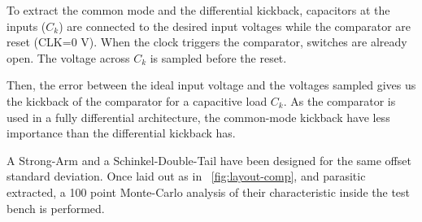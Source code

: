 To extract the common mode and the differential kickback, capacitors at the inputs (\(C_{k}\)) are connected to the desired input voltages while the comparator are reset (CLK=0 V). When the clock triggers the comparator, switches are already open. The voltage across \(C_{k}\) is sampled before the reset.

Then, the error between the ideal input voltage and the voltages sampled gives us the kickback of the comparator for a capacitive load \(C_{k}\). As the comparator is used in a fully differential architecture, the common-mode kickback have less importance than the differential kickback has.

A Strong-Arm and a Schinkel-Double-Tail have been designed for the same offset standard deviation. Once laid out as in \figurename~\ref{fig:layout-comp}, and parasitic extracted, a 100 point Monte-Carlo analysis of their characteristic inside the test bench is performed. 

